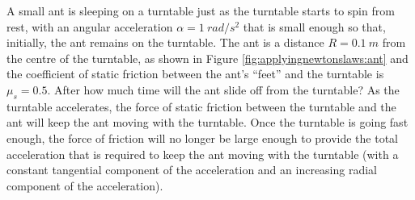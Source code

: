 \begin{example}{
A small ant is sleeping on a turntable just as the turntable starts to spin from rest, with an angular acceleration $\alpha=\SI{1}{rad/s^2}$ that is small enough so that, initially, the ant remains on the turntable. The ant is a distance $R=\SI{0.1}{m}$ from the centre of the turntable, as shown in Figure \ref{fig:applyingnewtonslaws:ant}  and the coefficient of static friction between the ant's ``feet'' and the turntable is $\mu_s=0.5$. After how much time will the ant slide off from the turntable?}
As the turntable accelerates, the force of static friction between the turntable and the ant will keep the ant moving with the turntable. Once the turntable is going fast enough, the force of friction will no longer be large enough to provide the total acceleration that is required to keep the ant moving with the turntable (with a constant tangential component of the acceleration and an increasing radial component of the acceleration). 


\end{example}
